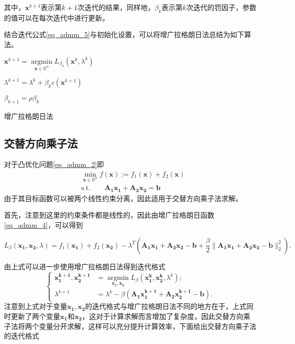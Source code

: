 其中，$\bm{x}^{k+1}$表示第$k+1$次迭代的结果，同样地，$\beta_{k}$表示第$k$次迭代的罚因子，参数的值可以在每次迭代中进行更新。

结合迭代公式\ref{eq_admm_5}与初始化设置，可以将增广拉格朗日法总结为如下算法。

\begin{algorithm}\label{alg_admm_1}

    \SetAlgoLined

     {
        $\bm{x}^{k+1} = \mathop{\mathrm{argmin}}\limits_{\bm{x}\in \mathbb{R}^{n}} L_{\beta_{k}}(\bm{x}^{k}, \lambda^{k})$
        
        $\lambda^{k+1} = \lambda^{k} + \beta_{k} c(\bm{x}^{k+1})$

        $\beta_{k+1} = \rho \beta_{k}$
    }
    \caption{增广拉格朗日法}
\end{algorithm}

\subsection{交替方向乘子法}

对于凸优化问题\ref{eq_admm_2}即
\begin{equation*}
    \begin{split}
        &\min\limits_{\bm{x}\in \mathbb{R}^{n}} f(\bm{x}) := f_{1}(\bm{x}) + f_{2}(\bm{x}) \\
        &\mathrm{s. t.} \quad\quad \bm{A_{1}x_{1}} + \bm{A_{2}x_{2}} = \bm{b} 
    \end{split}
\end{equation*}
由于其目标函数可以被两个线性约束分离，因此适用于交替方向乘子法求解。

首先，注意到这里的约束条件都是线性的，因此由增广拉格朗日函数\ref{eq_admm_4}，可以得到

\begin{equation}
    L_{\beta}(\bm{x_{1}, x_{2}}, \lambda) = f_{1}(\bm{x_{1}}) + f_{2}(\bm{x_{2}}) - \lambda^{T}(\bm{A_{1}x_{1} + A_{2}x_{2}-b} + \frac{\beta}{2}\|\bm{A_{1}x_{1} + A_{2}x_{2}-b}\|_{2}^{2}).
\end{equation}

由上式可以进一步使用增广拉格朗日法得到迭代格式
\begin{equation}
    \begin{cases}
        \bm{x_{1}^{k+1}, x_{2}^{k+1}} &= \mathop{\mathrm{argmin}}\limits_{\bm{x_{1}, x_{2}}} L_{\beta}(\bm{x_{1}^{k}, x_{2}^{k}}, \lambda^{k}); \\
        \lambda^{k+1} &= \lambda^{k} - \beta (\bm{A_{1}x_{1}^{k+1} + A_{2}x_{2}^{k+1} - b}).
    \end{cases}
\end{equation}
注意到上式对于变量$\bm{x_{1}, x_{2}}$的迭代格式与增广拉格朗日法不同的地方在于，上式同时更新了两个变量$\bm{x_{1}}$和$\bm{x_{2}}$，这对于计算求解而言增加了复杂度，因此交替方向乘子法将两个变量分开求解，这样可以充分提升计算效率，下面给出交替方向乘子法的迭代格式

